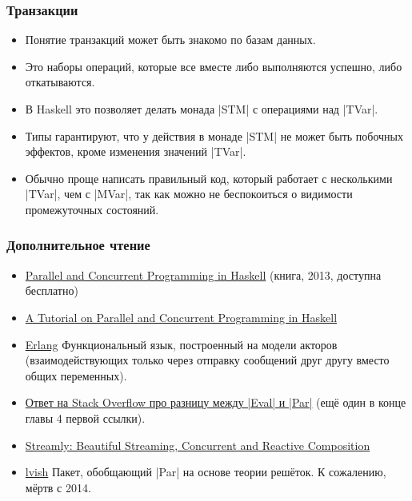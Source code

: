 \documentclass[11pt]{beamer}
\begin{document}
\begin{frame}[fragile]
  \frametitle{Транзакции}
  \begin{itemize}
    \item Понятие транзакций может быть знакомо по базам данных.
    \item Это наборы операций, которые все вместе либо выполняются успешно, либо откатываются.
    \item В Haskell это позволяет делать монада \haskinline|STM| с операциями над \haskinline|TVar|.
    \item Типы гарантируют, что у действия в монаде \haskinline|STM| не может быть побочных эффектов, кроме изменения значений \haskinline|TVar|.
    \item Обычно проще написать правильный код, который работает с несколькими \haskinline|TVar|, чем с \haskinline|MVar|, так как можно не беспокоиться о видимости промежуточных состояний.
  \end{itemize}
\end{frame}

\begin{frame}[fragile]
  \frametitle{Дополнительное чтение}
  \begin{itemize}
    \item \href{https://simonmar.github.io/pages/pcph.html}{Parallel and Concurrent Programming in Haskell} (книга, 2013, доступна бесплатно)
    \item \href{https://www.microsoft.com/en-us/research/wp-content/uploads/2016/02/parallel_haskell2.pdf}{A Tutorial on Parallel and Concurrent Programming in Haskell}
    \item \href{https://erlang.org/}{Erlang} Функциональный язык, построенный на модели акторов (взаимодействующих только через отправку сообщений друг другу вместо общих переменных).
    \item \href{https://stackoverflow.com/questions/23326920/difference-between-par-monad-and-eval-monad-with-deepseq/23428610#23428610}{Ответ на Stack Overflow про разницу между \haskinline|Eval| и \haskinline|Par|} (ещё один в конце главы 4 первой ссылки).
    \item \href{https://hackage.haskell.org/package/streamly}{Streamly: Beautiful Streaming, Concurrent and Reactive Composition}
    \item \href{https://hackage.haskell.org/package/lvish-1.1.4/}{lvish} Пакет, обобщающий \haskinline|Par| на основе теории решёток. К сожалению, мёртв с 2014.
  \end{itemize}
\end{frame}
\end{document}
